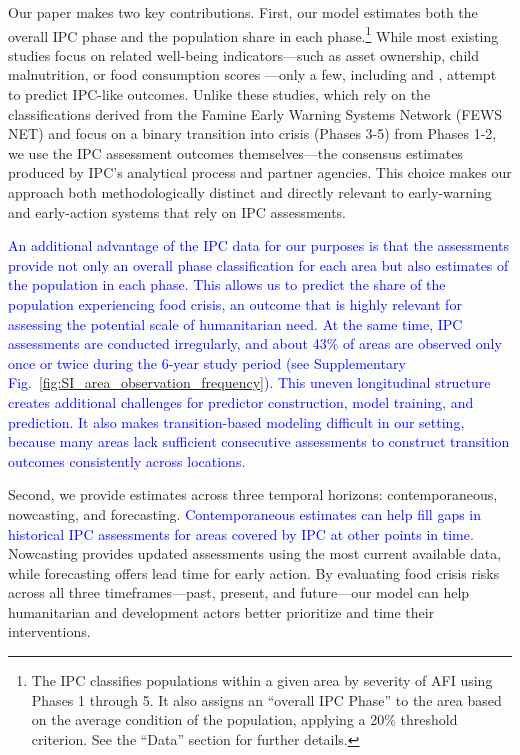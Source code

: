 \documentclass[pdflatex,sn-mathphys-num]{sn-jnl}%
\theoremstyle{thmstyleone}%
\theoremstyle{thmstyletwo}%
\theoremstyle{thmstylethree}%
\begin{document}
Our paper makes two key contributions. First, our model estimates both the overall IPC phase and the population share in each phase.\footnote{The IPC classifies populations within a given area by severity of AFI using Phases 1 through 5. It also assigns an “overall IPC Phase” to the area based on the average condition of the population, applying a 20\% threshold criterion. See the “Data” section for further details.} While most existing studies focus on related well-being indicators—such as asset ownership, child malnutrition, or food consumption scores \citep{yeh2020using, browne2021covid, martini2022machine, balashankar2023predicting}—only a few, including \cite{andree2020predicting} and \cite{balashankar2023predicting}, attempt to predict IPC-like outcomes. Unlike these studies, which rely on the classifications derived from the Famine Early Warning Systems Network (FEWS NET) and focus on a binary transition into crisis (Phases 3-5) from Phases 1-2, we use the IPC assessment outcomes themselves—the consensus estimates produced by IPC’s analytical process and partner agencies. This choice makes our approach both methodologically distinct and directly relevant to early-warning and early-action systems that rely on IPC assessments. %

\textcolor{blue}{An additional advantage of the IPC data for our purposes is that the assessments provide not only an overall phase classification for each area but also estimates of the population in each phase. This allows us to predict the share of the population experiencing food crisis, an outcome that is highly relevant for assessing the potential scale of humanitarian need. At the same time, IPC assessments are conducted irregularly, and about 43\% of areas are observed only once or twice during the 6-year study period (see Supplementary Fig.~\ref{fig:SI_area_observation_frequency}). This uneven longitudinal structure creates additional challenges for predictor construction, model training, and prediction. It also makes transition-based modeling difficult in our setting, because many areas lack sufficient consecutive assessments to construct transition outcomes consistently across locations.}

Second, we provide estimates across three temporal horizons: contemporaneous, nowcasting, and forecasting. \textcolor{blue}{Contemporaneous estimates can help fill gaps in historical IPC assessments for areas covered by IPC at other points in time.} Nowcasting provides updated assessments using the most current available data, while forecasting offers lead time for early action. By evaluating food crisis risks across all three timeframes—past, present, and future—our model can help humanitarian and development actors better prioritize and time their interventions.
\end{document}
